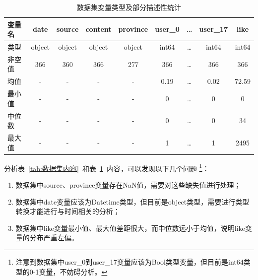 \documentclass[UTF8]{ctexart}
\begin{document}
\begin{table}[!ht] \centering
    \begin{tabularx}{\linewidth}{X c c c c c c c c}
        \toprule
        变量名 & date & source & content & province & user\_0 & \dots & user\_17 & like \\
        \midrule
        类型 & object & object & object & object & int64 & \dots & int64 & int64 \\
        非空值 & 366 & 360 & 366 & 277 & 366 & \dots & 366 & 366 \\
        均值 & - & - & - & - & 0.19 & \dots & 0.02 & 72.59 \\
        最小值 & - & - & - & - & 0 & \dots & 0 & 0 \\
        中位数 & - & - & - & - & 0 & \dots & 0 & 34 \\
        最大值 & - & - & - & - & 1 & \dots & 1 & 2495 \\
        \bottomrule
    \end{tabularx}
    \caption{数据集变量类型及部分描述性统计}
    \label{tab:数据集变量类型、部分描述性}
\end{table}

分析表~\ref{tab:数据集内容}~和表~\ref{tab:数据集变量类型、部分描述性}~内容，可以发现以下几个问题
\footnote{注意到数据集中user\_0到user\_17变量应该为Bool类型变量，但目前是int64类型的0-1变量，不妨碍分析。}：
\begin{enumerate}
    \item 数据集中source、province变量存在NaN值，需要对这些缺失值进行处理；
    \item 数据集中date变量应该为Datetime类型，但目前是object类型，需要进行类型转换才能进行与时间相关的分析；
    \item 数据集中like变量最小值、最大值差距很大，而中位数远小于均值，说明like变量的分布严重左偏。
\end{enumerate}
\end{document}
